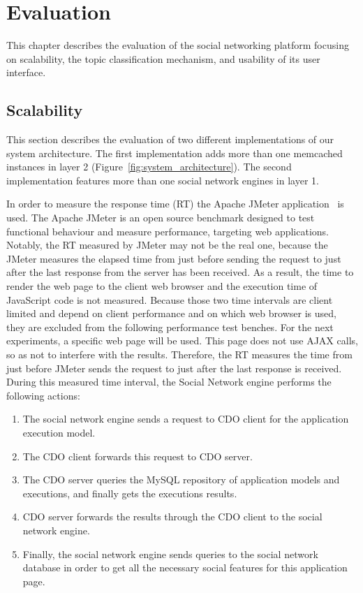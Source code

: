 \chapter{Evaluation}
\label{chapt:evaluation}
This chapter describes the evaluation of the social networking platform focusing on scalability, the topic classification mechanism, and usability of its user interface.  

\section{Scalability}
\label{sec:eval_scalability}
This section describes the evaluation of two different implementations of our system architecture. The first implementation adds more than one memcached instances in layer 2 (Figure~\ref{fig:system_architecture}). The second implementation features more than one social network engines in layer 1.

In order to measure the response time (RT) the Apache JMeter application~\cite{jmeter_url} is used. The Apache JMeter is an open source benchmark designed to test functional behaviour and  measure performance, targeting web applications. Notably, the RT measured by JMeter may not be the real one, because the JMeter measures the elapsed time from just before sending the request to just after the last response from the server has been received. As a result, the time to render the web page to the client web browser and the execution time of JavaScript code is not measured. Because those two time intervals are client limited and depend on client performance and on which web browser is used, they are excluded from the following performance test benches. For the next experiments, a specific web page will be used. This page does not use AJAX calls, so as not to interfere with the results. Therefore, the RT measures the time from just before JMeter sends the request to just after the last response is received. During this measured time interval, the Social Network engine performs the following actions:
\begin{enumerate}[I]
\item The social network engine sends a request to CDO client for the application execution model.
\item The CDO client forwards this request to CDO server.
\item The CDO server queries the MySQL repository of application models and executions, and finally gets the executions results.
\item CDO server forwards the results through the CDO client to the social network engine.
\item Finally, the social network engine sends queries to the social network database in order to get all the necessary social features for this application page.
\end{enumerate}

